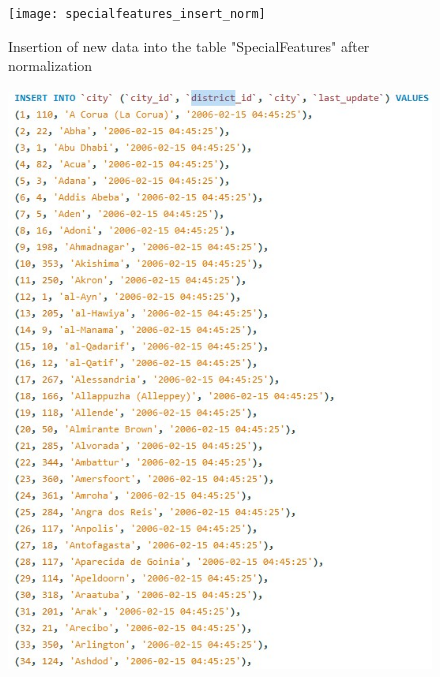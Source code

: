 \documentclass{article}
\begin{document}
		\begin{figure}[H]
			\texttt{[image: specialfeatures\_insert\_norm]}
			\caption{Insertion of new data into the table "Special\textunderscore Features" after normalization}
		\end{figure}
		\begin{figure}[H]
			\includegraphics[width=\textwidth]{district1_insert_norm}

\end{figure}
\end{document}
